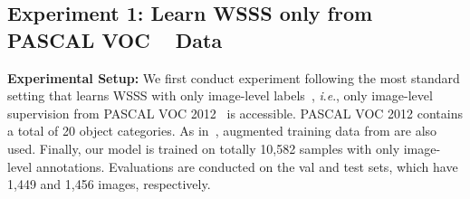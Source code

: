 \documentclass[runningheads]{llncs}
\newcommand{\ie}{\textit{i}.\textit{e}.}
\begin{document}
\subsection{Experiment 1: Learn WSSS only from PASCAL VOC ~\cite{everingham2015pascal} Data} \label{sec:ex-qp1}
\vspace{-3pt}
\noindent\textbf{Experimental Setup:} We first conduct experiment following the most standard setting that learns WSSS with only image-level labels~\cite{oaa2019,ssdd2019,wei2017object,dsrg2018}, \ie, only image-level supervision from PASCAL VOC 2012~\cite{everingham2015pascal} is accessible. PASCAL VOC 2012 contains a total of 20 object categories. As in~\cite{chen2017deeplab,wei2017object}, augmented training data from \cite{hariharan2011semantic} are also used. Finally, our model is trained on totally 10,582 samples with only image-level annotations.  Evaluations are conducted on the val and test sets, which have 1,449 and 1,456 images, respectively.
\end{document}
